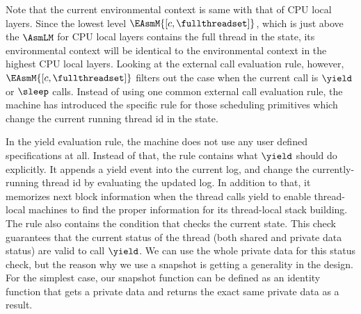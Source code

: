 Note that the current environmental context is same with that of CPU local layers. 
Since the lowest level $\EAsmM{[c, \fullthreadset]}$, which is just above the $\AsmLM$ for CPU local layers
contains the full thread in the state, 
its environmental context will be identical to the environmental context in 
the highest CPU local layers.
Looking at the external call evaluation rule, however, $\EAsmM{[c, \fullthreadset]}$
filters out the case when the current call is 
$\yield$ or $\sleep$ calls. 
Instead of using one common external call evaluation rule, the machine has introduced the 
specific rule for those scheduling primitives 
which change the current running thread id in the state.
\begin{tiny}
\begin{mathpar}
\end{mathpar}
\end{tiny}
In the yield evaluation rule, the machine does not use any user defined specifications at all. 
Instead of that, the rule contains what $\yield$ should do explicitly. 
It appends a yield event into the current log, and change the currently-running thread id by evaluating the updated log.
In addition to that, it memorizes next block information when the thread calls yield to enable thread-local machines to
find the proper information for its thread-local stack building. 
The rule also contains the condition that checks the current state. 
This check guarantees that the current status of the thread (both shared and private data status) are valid to call $\yield$. 
We can use the whole private data for this status check, but the reason why we use a snapshot is getting a generality in the design. 
For the simplest case, our snapshot function can be defined as an identity function 
that gets a private data and returns the exact same private data as a result.

